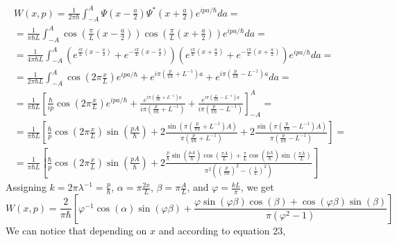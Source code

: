 \documentclass{article}
\begin{document}
\begin{equation}
\begin{gathered}
    W(x, p) = \frac{1}{2\pi\hbar} \int_{-A}^{A} \Psi\left(x - \frac{a}{2}\right) \Psi^* \left(x + \frac{a}{2}\right) e^{ipa/\hbar}da = \\
    = \frac{1}{\pi\hbar L} \int_{-A}^{A}
    \cos(\frac{\pi}{L}\left(x - \frac{a}{2}\right))
    \cos(\frac{\pi}{L}\left(x + \frac{a}{2}\right))
    e^{ipa/\hbar}da = \\
    = \frac{1}{4\pi\hbar L} \int_{-A}^{A}
    \left(e^{\frac{i\pi}{L}(x-\frac{a}{2})} + e^{-\frac{i\pi}{L}(x-\frac{a}{2})}\right)
    \left(e^{\frac{i\pi}{L}(x+\frac{a}{2})} + e^{-\frac{i\pi}{L}(x+\frac{a}{2})}\right)
    e^{ipa/\hbar}da = \\
    = \frac{1}{2\pi\hbar L} \int_{-A}^{A}
    \cos(2\pi\frac{x}{L})e^{ipa/\hbar}
    + e^{i\pi(\frac{p}{\pi\hbar} + L^{-1})a}
    + e^{i\pi(\frac{p}{\pi\hbar} - L^{-1})a}
    da= \\
    = \frac{1}{\pi\hbar L} \left[
    \frac{\hbar}{ip}\cos(2\pi\frac{x}{L})e^{ipa/\hbar}
    + \frac{e^{i\pi(\frac{p}{\pi\hbar} + L^{-1})a}}{i\pi(\frac{p}{\pi\hbar} + L^{-1})}
    + \frac{e^{i\pi(\frac{p}{\pi\hbar} - L^{-1})a}}{i\pi(\frac{p}{\pi\hbar} - L^{-1})}
    \right]_{-A}^{A} = \\
    = \frac{1}{\pi\hbar L} \left[
    \frac{\hbar}{p}\cos(2\pi\frac{x}{L})\sin(\frac{pA}{\hbar})
    + 2\frac{\sin(\pi(\frac{p}{\pi\hbar} + L^{-1})A)}{\pi(\frac{p}{\pi\hbar} + L^{-1})}
    + 2\frac{\sin(\pi(\frac{p}{\pi\hbar} - L^{-1})A)}{\pi(\frac{p}{\pi\hbar} - L^{-1})}
    \right] = \\
    = \frac{1}{\pi\hbar L} \left[
    \frac{\hbar}{p}\cos(2\pi\frac{x}{L})\sin(\frac{pA}{\hbar})
    + 2\frac{\frac{p}{\hbar}\sin(\frac{pA}{\hbar})\cos(\frac{\pi A}{L}) + \frac{\pi}{L}\cos(\frac{pA}{\hbar})\sin(\frac{\pi A}{L})}
    {\pi^2\left(\left(\frac{p}{\pi\hbar}\right)^2 - \left(\frac{1}{L}\right)^2\right)}
    \right]
\end{gathered}
\end{equation}
Assigning $k = 2\pi\lambda^{-1} = \frac{p}{\hbar}$, $\alpha = \pi\frac{2x}{L}$, $\beta = \pi\frac{A}{L}$, and $\varphi = \frac{kL}{\pi}$, we get
\begin{equation}
    W(x, p) = \frac{2}{\pi \hbar} \left[
    \varphi^{-1}\cos(\alpha)\sin(\varphi \beta)
    + \frac{\varphi\sin(\varphi \beta)\cos(\beta) + \cos(\varphi \beta)\sin(\beta)}
    {\pi\left(\varphi^2 - 1\right)} \right]
\end{equation}
We can notice that depending on $x$ and according to equation 23,
\end{document}
